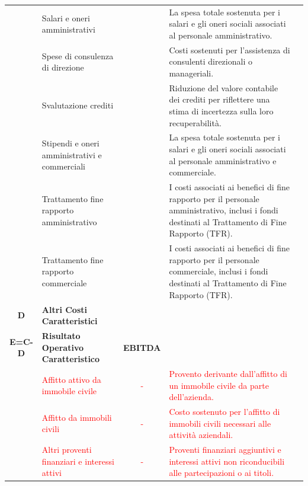 \documentclass{article}
\newcommand{\SalariOneriAmministrativi}{La spesa totale sostenuta per i salari e gli oneri sociali associati al personale amministrativo.}
\newcommand{\SpeseConsulenzaDirezione}{Costi sostenuti per l'assistenza di consulenti direzionali o manageriali.}
\newcommand{\SvalutazioneCrediti}{Riduzione del valore contabile dei crediti per riflettere una stima di incertezza sulla loro recuperabilità.}
\newcommand{\StipendiOneriAmministrativiCommerciati}{La spesa totale sostenuta per i salari e gli oneri sociali associati al personale amministrativo e commerciale.}
\newcommand{\TrattamentoFineRapportoAmministrativo}{I costi associati ai benefici di fine rapporto per il personale amministrativo, inclusi i fondi destinati al Trattamento di Fine Rapporto (TFR).}
\newcommand{\TrattamentoFineRapportoCommerciale}{I costi associati ai benefici di fine rapporto per il personale commerciale, inclusi i fondi destinati al Trattamento di Fine Rapporto (TFR).}
\newcommand{\AffittoAttivoImmobileCivile}{Provento derivante dall'affitto di un immobile civile da parte dell'azienda.}
\newcommand{\AffittoImmobiliCivili}{Costo sostenuto per l'affitto di immobili civili necessari alle attività aziendali.}
\newcommand{\AltriProventiFinanziariInteressiAttivi}{Proventi finanziari aggiuntivi e interessi attivi non riconducibili alle partecipazioni o ai titoli.}
\begin{document}
\begin{table}[ht]
{\begin{tabular}{|c l|c|l|c|}
                           & Salari e oneri amministrativi                                           &                    & \SalariOneriAmministrativi                                  &           \\
                           & Spese di consulenza di direzione                                        &                    & \SpeseConsulenzaDirezione                                   &           \\
                           & Svalutazione crediti                                                    &                    & \SvalutazioneCrediti                                        &           \\
                           & Stipendi e oneri amministrativi e commerciali                           &                    & \StipendiOneriAmministrativiCommerciati                     &           \\
                           & Trattamento fine rapporto amministrativo                                &                    & \TrattamentoFineRapportoAmministrativo                      &           \\
                           & Trattamento fine rapporto commerciale                                   &                    & \TrattamentoFineRapportoCommerciale                         &           \\
            \textbf{D}     & \textbf{Altri Costi Caratteristici}                                     &                    &                                                             &           \\
            \hline
            \textbf{E=C-D} & \textbf{Risultato Operativo Caratteristico}                             & \textbf{EBITDA}    &                                                             &           \\
            \hline
                           & \textcolor{red}{Affitto attivo da immobile civile}                      & \textcolor{red}{-} & \textcolor{red}{\AffittoAttivoImmobileCivile}               &           \\
                           & \textcolor{red}{Affitto da immobili civili}                             & \textcolor{red}{-} & \textcolor{red}{\AffittoImmobiliCivili}                     &           \\
                           & \textcolor{red}{Altri proventi finanziari e interessi attivi}           & \textcolor{red}{-} & \textcolor{red}{\AltriProventiFinanziariInteressiAttivi}    &           \\

\end{tabular}}
\end{table}
\end{document}
